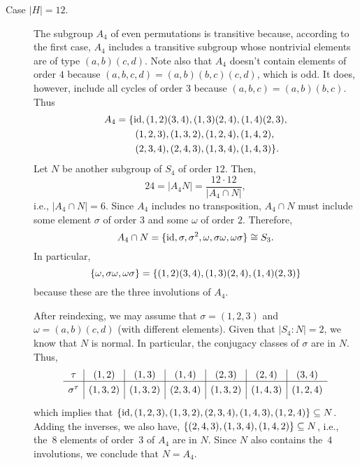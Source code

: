\begin{solution}
\begin{description}
        \item[Case $|H|=12$.] The subgroup $A_4$ of even permutations is transitive because, according to the first case, $A_4$ includes a transitive subgroup whose nontrivial elements are of type $(a,b)(c,d)$. Note also that $A_4$ doesn't contain elements of order $4$ because $(a,b,c,d)=(a,b)(b,c)(c,d)$, which is odd. It does, however, include all cycles of order $3$ because $(a,b,c)=(a,b)(b,c)$. Thus
        \small
        \begin{align*}
            A_4 &= \{\operatorname{id}, (1,2)(3,4), (1,3)(2,4), (1,4)(2,3),\\
                &\qquad (1,2,3), (1,3,2),(1,2,4),(1,4,2),\\
                &\qquad (2,3,4),(2,4,3),(1,3,4),(1,4,3)\}.
        \end{align*}
        \normalsize
        Let $N$ be another subgroup of $S_4$ of order $12$. Then,
        \small
        $$
            24 = |A_4N| = \frac{12\cdot12}{|A_4\cap N|},
        $$
        \normalsize
        i.e., $|A_4\cap N|=6$. Since $A_4$ includes no transposition, $A_4\cap N$ must include some element $\sigma$ of order $3$ and some $\omega$ of order $2$. Therefore,
        \small
        $$
            A_4\cap N=\{\operatorname{id}, \sigma,\sigma^2,\omega,\sigma\omega,\omega\sigma\}
            \cong S_3.
        $$
        In particular, 
        \small
        $$
            \{\omega, \sigma\omega, \omega\sigma\}
                =\{(1,2)(3,4), (1,3)(2,4), (1,4)(2,3)\}
        $$
        \normalsize
        because these are the three involutions of $A_4$.

        After reindexing, we may assume that $\sigma=(1,2,3)$ and $\omega=(a,b)(c,d)$ (with different elements). Given that $|S_4:N|=2$, we know that $N$ is normal. In particular, the conjugacy classes of $\sigma$ are in $N$. Thus,
        \small
        $$
            \begin{array}{c|c|c|c|c|c|c}
            \tau
                &(1,2) &(1,3) &(1,4) &(2,3) &(2,4) &(3,4)\\
            \hline
            \vphantom{\Big|}\sigma^\tau
                &(1,3,2) &(1,3,2) &(2,3,4) &(1,3,2) &(1,4,3)&(1,2,4)
            \end{array}
        $$
        \normalsize
        which implies that $\{\operatorname{id},(1,2,3),(1,3,2),(2,3,4),(1,4,3),(1,2,4)\}\subseteq N$. Adding the inverses, we also have, $\{(2,4,3),(1,3,4),(1,4,2)\}\subseteq N$, i.e., the~$8$ elements of order~$3$ of $A_4$ are in $N$. Since $N$ also contains the~$4$ involutions, we conclude that $N=A_4$.
    \end{description}
\end{solution}

